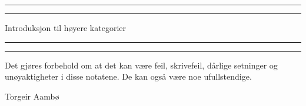 

\begin{titlingpage}
    \vspace*{\fill}
    \rule[-11pt]{\textwidth}{1pt}
    \rule{\textwidth}{0.5pt}
    \begin{center}
    \Large Introduksjon til høyere kategorier
    \end{center}
    \rule{\textwidth}{0.5pt}
    \rule[10.1pt]{\textwidth}{1pt}
    \begin{center}
    Det gjøres forbehold om at det kan være feil, skrivefeil, dårlige setninger og unøyaktigheter i disse notatene. De kan også være noe ufullstendige. 
    
    Torgeir Aambø 
    \end{center}
    \vspace{\fill}
    \tableofcontents
    \vspace{\fill}
\end{titlingpage}